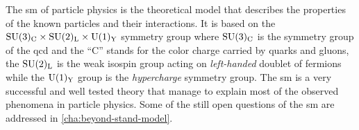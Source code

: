 The \gls{sm} of particle physics is the theoretical model that describes the
properties of the known particles and their interactions. It is based on the
$\mathrm{SU}(3)_\mathrm{C} \times \mathrm{SU}(2)_\mathrm{L} \times \mathrm{U}(1)_\mathrm{Y}$ symmetry group where $\mathrm{SU}(3)_\mathrm{C}$ is the
symmetry group of the \gls{qcd} and the ``C'' stands for the color charge
carried by quarks and gluons, the $\mathrm{SU}(2)_\mathrm{L}$ is the weak isospin group acting on
\emph{left-handed} doublet of fermions while the $\mathrm{U}(1)_\mathrm{Y}$ group is the
\emph{hypercharge} symmetry group. The \gls{sm} is a very successful and well
tested theory that manage to explain most of the observed phenomena in particle
physics. Some of the still open questions of the \gls{sm} are addressed in
\cref{cha:beyond-stand-model}.



